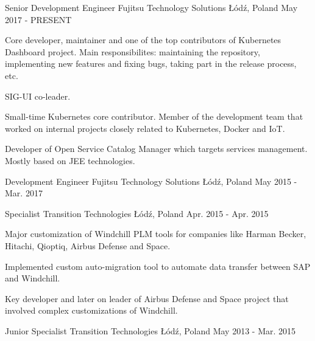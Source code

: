 

\begin{cventries}

  \cventry
    {Senior Development Engineer} %
    {Fujitsu Technology Solutions} %
    {Łódź, Poland} %
    {May 2017 - PRESENT} %
    {
      \begin{cvitems} %
        \item {
        Core developer, maintainer and one of the top contributors of Kubernetes Dashboard project. Main responsibilites:
        maintaining the repository, implementing new features and fixing bugs, taking part in the release process, etc.
        }
        \item {SIG-UI co-leader.}
        \item {Small-time Kubernetes core contributor. Member of the development team that worked on internal projects closely
        related to Kubernetes, Docker and IoT.
        }
        \item {Developer of Open Service Catalog Manager which targets services management. Mostly based on JEE technologies.}
      \end{cvitems}
    }

  \cventry
    {Development Engineer} %
    {Fujitsu Technology Solutions} %
    {Łódź, Poland} %
    {May 2015 - Mar. 2017} %
    {}

  \cventry
    {Specialist} %
    {Transition Technologies} %
    {Łódź, Poland} %
    {Apr. 2015 - Apr. 2015} %
    {
    \begin{cvitems} %
      \item {Major customization of Windchill PLM tools for companies like Harman Becker, Hitachi, Qioptiq, Airbus Defense and Space.}
      \item {Implemented custom auto-migration tool to automate data transfer between SAP and Windchill.}
      \item {Key developer and later on leader of Airbus Defense and Space project that involved complex customizations of Windchill.}
    \end{cvitems}
    }

  \cventry
    {Junior Specialist} %
    {Transition Technologies} %
    {Łódź, Poland} %
    {May 2013 - Mar. 2015} %
    {}

\end{cventries}
